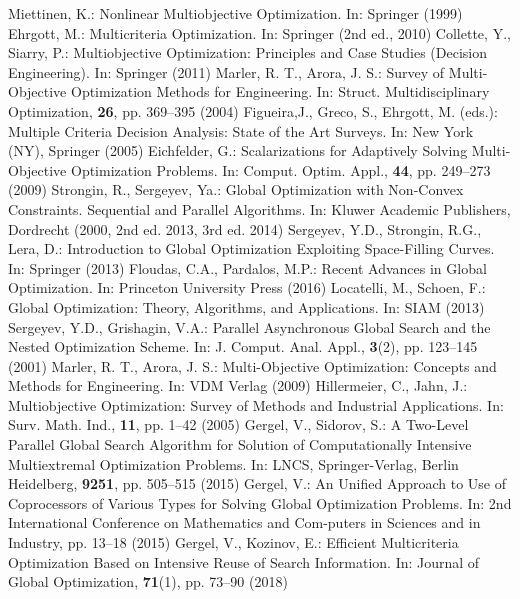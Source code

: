 \begin{thebibliography}{}
%
%
 	Miettinen, K.: Nonlinear Multiobjective Optimization. In: Springer (1999)
 	Ehrgott, M.: Multicriteria Optimization. In: Springer (2nd ed., 2010)
 	Collette, Y., Siarry, P.: Multiobjective Optimization: Principles and Case Studies (Decision Engineering). In: Springer (2011)
 	Marler, R. T., Arora, J. S.: Survey of Multi-Objective Optimization Methods for Engineering. In: Struct. Multidisciplinary Optimization, \textbf{26}, pp. 369--395 (2004)
 	Figueira,J., Greco, S., Ehrgott, M. (eds.): Multiple Criteria Decision Analysis: State of the Art Surveys. In: New York (NY), Springer (2005)
 	Eichfelder, G.: Scalarizations for Adaptively Solving Multi-Objective Optimization Problems. In: Comput. Optim. Appl., \textbf{44}, pp. 249--273 (2009)
 	Strongin, R., Sergeyev, Ya.: Global Optimization with Non-Convex Constraints. Sequential and Parallel Algorithms. In: Kluwer Academic Publishers, Dordrecht (2000, 2nd ed. 2013, 3rd ed. 2014)
 	Sergeyev, Y.D., Strongin, R.G., Lera, D.: Introduction to Global Optimization Exploiting Space-Filling Curves. In: Springer (2013)
 	Floudas, C.A., Pardalos, M.P.: Recent Advances in Global Optimization. In: Princeton University Press (2016)
	Locatelli, M., Schoen, F.: Global Optimization: Theory, Algorithms, and Applications. In: SIAM (2013)
	Sergeyev, Y.D., Grishagin, V.A.: Parallel Asynchronous Global Search and the Nested Optimization Scheme. In: J. Comput. Anal. Appl., \textbf{3}(2), pp. 123--145 (2001)
	Marler, R. T., Arora, J. S.: Multi-Objective Optimization: Concepts and Methods for Engineering. In: VDM Verlag (2009)
	Hillermeier, C., Jahn, J.: Multiobjective Optimization: Survey of Methods and Industrial Applications. In: Surv. Math. Ind., \textbf{11}, pp. 1--42 (2005)
	Gergel, V., Sidorov, S.: A Two-Level Parallel Global Search Algorithm for Solution of Computationally Intensive Multiextremal Optimization Problems. In: LNCS, Springer-Verlag, Berlin Heidelberg, \textbf{9251}, pp. 505--515 (2015)
	Gergel, V.: An Unified Approach to Use of Coprocessors of Various Types for Solving Global Optimization Problems. In: 2nd International Conference on Mathematics and Com-puters in Sciences and in Industry, pp. 13--18 (2015)
	Gergel, V., Kozinov, E.: Efficient Multicriteria Optimization Based on Intensive Reuse of Search Information. In: Journal of Global Optimization, \textbf{71}(1), pp. 73--90 (2018) 

\end{thebibliography}
